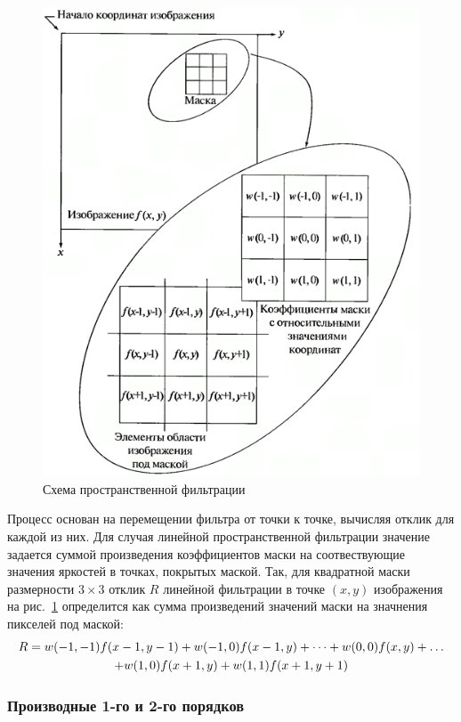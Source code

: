 \documentclass[12pt]{article} %
\begin{document}
\begin{figure}[h]
	
	\centering
	
	\includegraphics[width=0.7\linewidth]{prost_filt.jpg}
	
	\caption{Схема пространственной фильтрации}
	
	\label{fig:prost_filt}
	
\end{figure}

\newpage

Процесс основан на перемещении фильтра от точки к точке, вычисляя отклик для каждой из них. Для случая линейной пространственной фильтрации значение задается суммой произведения коэффициентов маски на соотвествующие значения яркостей в точках, покрытых маской. Так, для квадратной маски размерности $3\times3$ отклик $R$ линейной фильтрации в точке $(x, y)$ изображения на рис.~\ref{fig:prost_filt} определится как сумма произведений значений маски на значнения пикселей под маской:
\begin{gather}\label{3.1}
R = w(-1,-1)f(x-1, y-1) + w(-1,0)f(x-1,y)+\dots +w(0,0)f(x,y)+\dots \notag\\
+ w(1,0)f(x+1, y)+w(1,1)f(x+1, y+1)
\end{gather}

\subsubsection{Производные 1-го и 2-го порядков}
\end{document}
